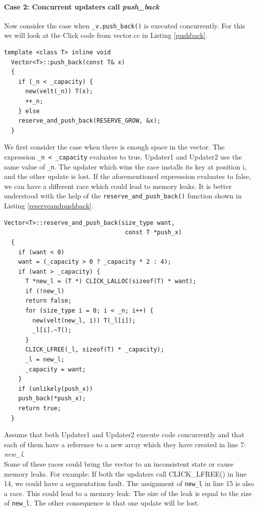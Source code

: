 \documentclass[12pt,a4paper]{article}
\begin{document}
\paragraph{Case 2: Concurrent updaters call \emph{push\_back} }
Now consider the case when \verb+_v.push_back()+ is executed concurrently. For this we will look at the Click code from vector.cc in Listing \ref{pushback}.
\begin{lstlisting}[caption = The push\_back() function, label=pushback]
  template <class T> inline void
  Vector<T>::push_back(const T& x)
  {
    if (_n < _capacity) {
      new(velt(_n)) T(x);
      ++_n;
    } else
    reserve_and_push_back(RESERVE_GROW, &x);
  }
\end{lstlisting}
We first consider the case when there is enough space in the vector. The expression \verb$_n < _capacity$ evaluates to true. Updater1 and Updater2 use the same value of \verb+_n+. The updater which wins the race installs its key at position i, and the other update is lost. If the aforementioned expresssion evaluates to false, we can have a different race which could lead to memory leaks. It is better understood with the help of the \verb+reserve_and_push_back()+ function shown in Listing \ref{reserveandpushback}.
\begin{lstlisting}[caption= reserve\_and\_push\_back(), label =reserveandpushback]
  Vector<T>::reserve_and_push_back(size_type want, 
                                  const T *push_x)
  {
    if (want < 0)
    want = (_capacity > 0 ? _capacity * 2 : 4);
    if (want > _capacity) {
      T *new_l = (T *) CLICK_LALLOC(sizeof(T) * want);
      if (!new_l)
      return false;
      for (size_type i = 0; i < _n; i++) {
        new(velt(new_l, i)) T(_l[i]);
        _l[i].~T();
      }
      CLICK_LFREE(_l, sizeof(T) * _capacity);
      _l = new_l;
      _capacity = want;
    }
    if (unlikely(push_x))
    push_back(*push_x);
    return true;
  }
\end{lstlisting}
Assume that both Updater1 and Updater2 execute code concurrently and that each of them have a reference to a new array which they have created in line 7: \emph{new\_l}.
\\Some of these races could bring the vector to an inconsistent state or cause memory leaks. For example: If both the updaters call CLICK\_LFREE() in line 14, we could have a segmentation fault. The assignment of \verb+new_l+ in line 15 is also a race. This could lead to a memory leak: The size of the leak is equal to the size of \verb+new_l+. The other consequence is that one update will be lost.
\end{document}
